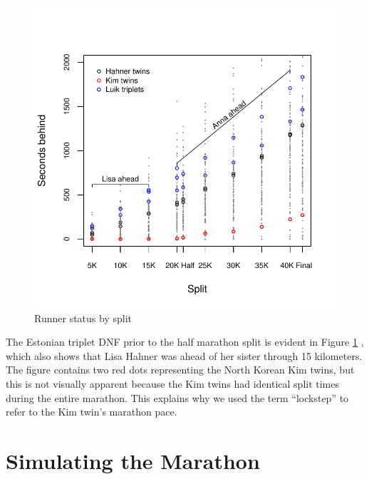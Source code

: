 \documentclass[12pt,titlepage]{article}
\begin{document}
\begin{figure}[!ht]
  \centering
  \caption{Runner status by split}
  \label{fig:secondsbehind}
  \includegraphics[scale = 1]{seconds-behind.pdf}
\end{figure}

The Estonian triplet DNF prior to the half marathon split is evident
in Figure \ref{fig:secondsbehind} , which also shows that Lisa Hahner
was ahead of her sister through 15 kilometers.  The figure contains
two red dots representing the North Korean Kim twins, but this is not
visually apparent because the Kim twins had identical split times
during the entire marathon.  This explains why we used the term
``lockstep'' to refer to the Kim twin's marathon pace.

\section*{Simulating the Marathon}

\end{document}
